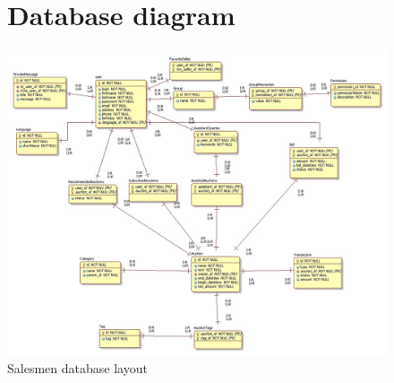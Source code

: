 \documentclass[a4paper, 12pt]{report}
\begin{document}
\begin{figure}
\section{Database diagram}
\label{fig_database}
\includegraphics[scale=0.5,angle=90]{../../img/erd1.jpg}
\caption{Salesmen database layout}
\end{figure}
\end{document}
